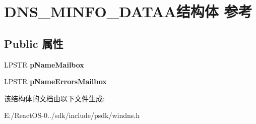 \hypertarget{struct_d_n_s___m_i_n_f_o___d_a_t_a_a}{}\section{D\+N\+S\+\_\+\+M\+I\+N\+F\+O\+\_\+\+D\+A\+T\+A\+A结构体 参考}
\label{struct_d_n_s___m_i_n_f_o___d_a_t_a_a}
\subsection*{Public 属性}
\begin{DoxyCompactItemize}
\item 
\mbox{\label{struct_d_n_s___m_i_n_f_o___d_a_t_a_a_a92138b5831b9804c51bf31f31d045e52}} 
L\+P\+S\+TR {\bfseries p\+Name\+Mailbox}
\item 
\mbox{\label{struct_d_n_s___m_i_n_f_o___d_a_t_a_a_a9f7b065e06fb6e35b71a989bb8a02391}} 
L\+P\+S\+TR {\bfseries p\+Name\+Errors\+Mailbox}
\end{DoxyCompactItemize}


该结构体的文档由以下文件生成\+:\begin{DoxyCompactItemize}
\item 
E\+:/\+React\+O\+S-\/0../sdk/include/psdk/windns.\+h\end{DoxyCompactItemize}
